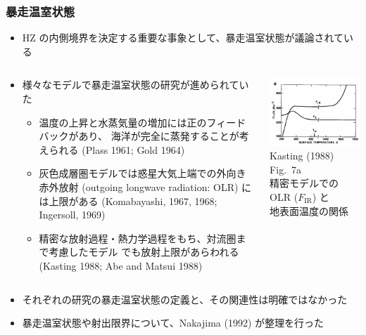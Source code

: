\documentclass[aspectratio=149,9pt,fleqn]{beamer}
\begin{document}
\begin{frame}
	\frametitle{暴走温室状態}
	\begin{itemize}
		\item HZ の内側境界を決定する重要な事象として、暴走温室状態が議論されている
	\end{itemize}
	\begin{columns}[T,onlytextwidth]
		\begin{column}{.65\textwidth}
			\begin{itemize}
				\item 様々なモデルで暴走温室状態の研究が進められていた
					\begin{itemize}
						\item 温度の上昇と水蒸気量の増加には正のフィードバックがあり、
							海洋が完全に蒸発することが考えられる (Plass 1961; Gold 1964)
						\item 灰色成層圏モデルでは惑星大気上端での外向き赤外放射
							(outgoing longwave radiation: OLR) には上限がある
							(Komabayashi, 1967, 1968; Ingersoll, 1969)
						\item 精密な放射過程・熱力学過程をもち、対流圏まで考慮したモデル
							でも放射上限があらわれる (Kasting 1988; Abe and Matsui 1988)
					\end{itemize}
			\end{itemize}
		\end{column}
		\begin{column}{.3\textwidth}
			\centering\small
			\includegraphics[width=.95\textwidth]{kasting7a.png}\\
			Kasting (1988) Fig.\ 7a\\
			精密モデルでの OLR (\(F_{\mathrm{IR}}\)) と\\
			地表面温度の関係
		\end{column}
	\end{columns}
	\begin{itemize}
		\item それぞれの研究の暴走温室状態の定義と、その関連性は明確ではなかった
		\item 暴走温室状態や射出限界について、Nakajima \etal (1992) が整理を行った
	\end{itemize}
\end{frame}
\end{document}
